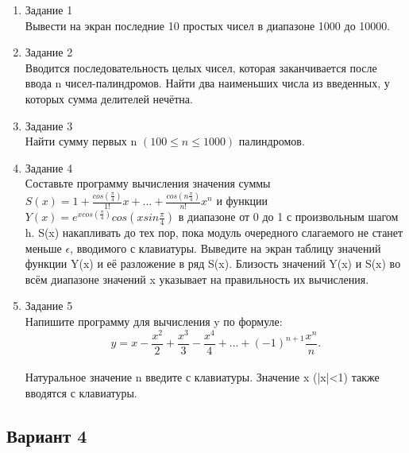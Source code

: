 \documentclass[a4paper]{article}
\begin{document}
	\begin{enumerate} 
		\item Задание 1 \\
			Вывести на экран последние 10 простых чисел в диапазоне 1000 до 10000.\\
		\item Задание 2\\
			Вводится последовательность целых чисел, которая заканчивается после ввода n чисел-палиндромов. 
			Найти два наименьших числа из введенных, у которых сумма делителей нечётна.\\
		\item Задание 3 \\
			Найти сумму первых n $(100 \le n \le 1000) $ палиндромов.\\
		\item Задание 4 \\
			Составьте программу вычисления значения суммы  $S(x)=1+\frac{cos(\frac{\pi}{4})}{1!}x+...+\frac{cos(n\frac{\pi}{4})}{n!}x^n$
			и функции $Y(x)=e^{xcos(\frac{\pi}{4})}cos(xsin\frac{\pi}{4})$ в диапазоне от 0 до 1
			с произвольным шагом h. S(x) накапливать до тех пор, пока модуль очередного слагаемого не станет меньше $\epsilon$, вводимого с клавиатуры. Выведите на экран таблицу значений функции Y(x) и её разложение в ряд S(x). Близость значений Y(x) и S(x) во всём диапазоне
			значений x указывает на правильность их вычисления.\\
		\item Задание 5 \\
			Напишите программу для вычисления y по формуле:\\
			$$y=x-\frac{x^2}{2}+\frac{x^3}{3}-\frac{x^4}{4}+...+(-1)^{n+1}\frac{x^n}{n}.$$\\
			Натуральное значение n введите с клавиатуры. Значение x (|x|<1) также вводятся с клавиатуры.\\
	\end{enumerate}
\newpage
	\begin{center}
		\subsection*{Вариант 4}
	\end{center}
\end{document}
